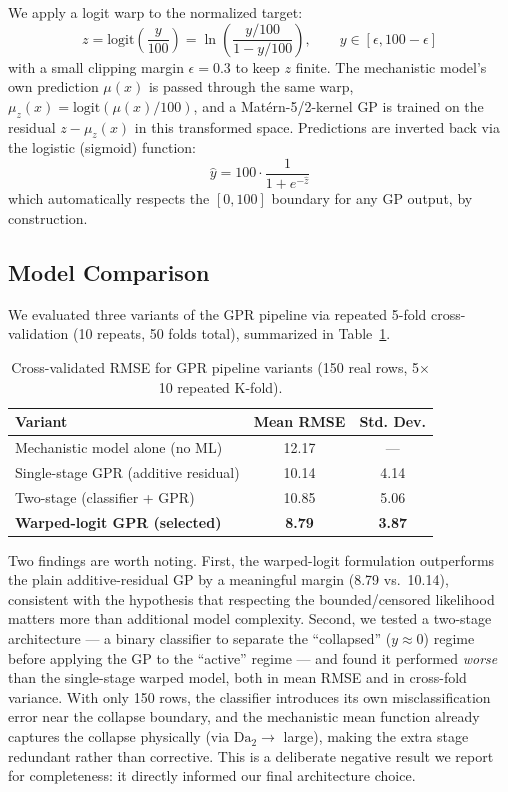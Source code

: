 \documentclass[11pt,a4paper]{article}
\begin{document}
We apply a logit warp to the normalized target:
\begin{equation}
  z = \text{logit}\!\left(\frac{y}{100}\right) = \ln\!\left(\frac{y/100}{1 - y/100}\right),
  \qquad y \in [\epsilon, 100-\epsilon]
\end{equation}
with a small clipping margin $\epsilon = 0.3$ to keep $z$ finite. The mechanistic model's own
prediction $\mu(x)$ is passed through the same warp, $\mu_z(x) = \text{logit}(\mu(x)/100)$, and a
Mat\'{e}rn-5/2-kernel GP is trained on the residual $z - \mu_z(x)$ in this transformed space.
Predictions are inverted back via the logistic (sigmoid) function:
\begin{equation}
  \hat{y} = 100 \cdot \frac{1}{1 + e^{-\hat{z}}}
\end{equation}
which automatically respects the $[0,100]$ boundary for any GP output, by construction.

\subsection{Model Comparison}

We evaluated three variants of the GPR pipeline via repeated 5-fold cross-validation (10 repeats,
50 folds total), summarized in Table~\ref{tab:gpr-variants}.

\begin{table}[h]
\centering
\caption{Cross-validated RMSE for GPR pipeline variants (150 real rows, 5$\times$10 repeated K-fold).}
\label{tab:gpr-variants}
\begin{tabular}{lcc}
\toprule
\textbf{Variant} & \textbf{Mean RMSE} & \textbf{Std. Dev.} \\
\midrule
Mechanistic model alone (no ML) & 12.17 & --- \\
Single-stage GPR (additive residual) & 10.14 & 4.14 \\
Two-stage (classifier + GPR) & 10.85 & 5.06 \\
\textbf{Warped-logit GPR (selected)} & \textbf{8.79} & \textbf{3.87} \\
\bottomrule
\end{tabular}
\end{table}

\noindent Two findings are worth noting. First, the warped-logit formulation outperforms the
plain additive-residual GP by a meaningful margin (8.79 vs.\ 10.14), consistent with the
hypothesis that respecting the bounded/censored likelihood matters more than additional model
complexity. Second, we tested a two-stage architecture --- a binary classifier to separate the
``collapsed'' ($y \approx 0$) regime before applying the GP to the ``active'' regime --- and found
it performed \emph{worse} than the single-stage warped model, both in mean RMSE and in
cross-fold variance. With only 150 rows, the classifier introduces its own misclassification
error near the collapse boundary, and the mechanistic mean function already captures the
collapse physically (via $\text{Da}_2 \to$ large), making the extra stage redundant rather than
corrective. This is a deliberate negative result we report for completeness: it directly informed
our final architecture choice.
\end{document}
